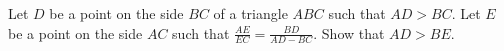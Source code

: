 Let $D$ be a point on the side $BC$ of a triangle $ABC$ such that $AD > BC$. Let $E$ be a point on the side $AC$ such that $\frac{AE}{EC} = \frac{BD}{AD-BC}$. Show that $AD > BE$.